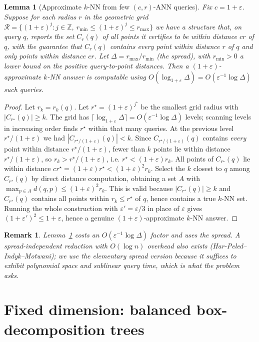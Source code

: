 \documentclass{amsart}
\newtheorem{lemma}{Lemma}
\newtheorem{remark}{Remark}
\newcommand{\eps}{\varepsilon}
\begin{document}
\begin{lemma}[Approximate $k$-NN from few $(c,r)$-ANN queries]\label{lem:anntoknn}
Fix $c=1+\eps$.  Suppose for each radius $r$ in the geometric grid
$\mathcal R=\{(1+\eps)^j: j\in\mathbb Z,\ r_{\min}\le (1+\eps)^j\le r_{\max}\}$ we have
a structure that, on query $q$, reports the set $C_r(q)$ of \emph{all} points it
certifies to be within distance $cr$ of $q$, with the guarantee that $C_r(q)$ contains
every point within distance $r$ of $q$ and only points within distance $cr$.  Let
$\Delta=r_{\max}/r_{\min}$ (the spread), with $r_{\min}>0$ a lower bound on the
positive query-to-point distances.  Then a $(1+\eps)$-approximate $k$-NN answer is
computable using $O(\log_{1+\eps}\Delta)=O(\eps^{-1}\log\Delta)$ such queries.
\end{lemma}
\begin{proof}
Let $r_k=r_k(q)$.  Let $r^\star=(1+\eps)^{j^\star}$ be the smallest grid radius with
$|C_{r^\star}(q)|\ge k$.  The grid has $\lceil\log_{1+\eps}\Delta\rceil
=O(\eps^{-1}\log\Delta)$ levels; scanning levels in increasing order finds $r^\star$
within that many queries.  At the previous level $r^\star/(1+\eps)$ we had
$|C_{r^\star/(1+\eps)}(q)|<k$.  Since $C_{r^\star/(1+\eps)}(q)$ contains \emph{every}
point within distance $r^\star/(1+\eps)$, fewer than $k$ points lie within distance
$r^\star/(1+\eps)$, so $r_k>r^\star/(1+\eps)$, i.e. $r^\star<(1+\eps)r_k$.  All points
of $C_{r^\star}(q)$ lie within distance $cr^\star=(1+\eps)r^\star<(1+\eps)^2r_k$.
Select the $k$ closest to $q$ among $C_{r^\star}(q)$ by direct distance computation,
obtaining a set $A$ with $\max_{p\in A}d(q,p)\le(1+\eps)^2 r_k$.  This is valid because
$|C_{r^\star}(q)|\ge k$ and $C_{r^\star}(q)$ contains all points within $r_k\le
r^\star$ of $q$, hence contains a true $k$-NN set.  Running the whole construction with
$\eps'=\eps/3$ in place of $\eps$ gives $(1+\eps')^2\le 1+\eps$, hence a genuine
$(1+\eps)$-approximate $k$-NN answer.
\end{proof}

\begin{remark}
Lemma~\ref{lem:anntoknn} costs an $O(\eps^{-1}\log\Delta)$ factor and uses the spread.
A spread-independent reduction with $O(\log n)$ overhead also exists
(Har-Peled--Indyk--Motwani); we use the elementary spread version because it suffices
to exhibit \emph{polynomial space} and \emph{sublinear query time}, which is what the
problem asks.
\end{remark}

\section{Fixed dimension: balanced box-decomposition trees}
\end{document}
